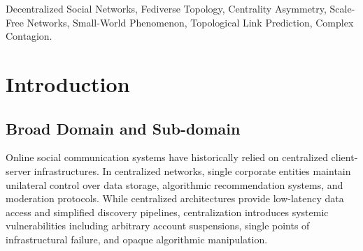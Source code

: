 \documentclass[conference]{IEEEtran}
\begin{document}
\begin{abstract}
Decentralized social architectures and federated media ecosystems distribute content syndication and administrative authority across autonomous server instances. The research investigates structural stratification, directional prestige asymmetry, and complex contagion dynamics within open federated networks. The investigation executes an empirical eleven-stage pipeline combining microscopic centrality formulations, Wasserman-Faust prestige metrics, Kleinberg spectral decomposition, Clauset maximum-likelihood power-law estimation, small-world benchmarking, topological link prediction heuristics, Granovetter behavioral threshold modeling, and discrete Markov random walk simulations on a directed graph of 1,553 instances and 43,879 links. Empirical degree sequences follow a scale-free power law with scaling exponent alpha equal to 2.6028, while the network exhibits small-world organization with coefficient sigma equal to 24.52. Preferential attachment achieves an area under the curve of 0.9767 in link prediction, while resource allocation attains perfect precision across the top one hundred predictions. Targeted seeding of the top eight percent of instances by PageRank precipitates a global cascade reaching 97.6 percent adoption, whereas uniform random seeding requires twenty percent penetration. Random walk visit frequencies converge ergodically to theoretical PageRank stationary probabilities, decreasing total variation distance to 0.0343.
\end{abstract}

\begin{IEEEkeywords}
Decentralized Social Networks, Fediverse Topology, Centrality Asymmetry, Scale-Free Networks, Small-World Phenomenon, Topological Link Prediction, Complex Contagion.
\end{IEEEkeywords}

\section{Introduction}

\subsection{Broad Domain and Sub-domain}
Online social communication systems have historically relied on centralized client-server infrastructures. In centralized networks, single corporate entities maintain unilateral control over data storage, algorithmic recommendation systems, and moderation protocols. While centralized architectures provide low-latency data access and simplified discovery pipelines, centralization introduces systemic vulnerabilities including arbitrary account suspensions, single points of infrastructural failure, and opaque algorithmic manipulation.
\end{document}
